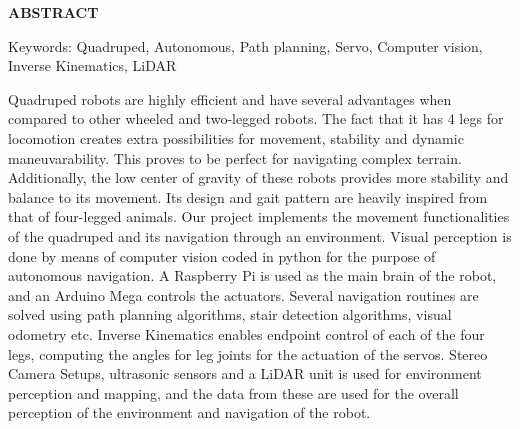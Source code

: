 \begin{center}
    \Large \textbf{ABSTRACT}\\
\end{center}
\vspace{0.5cm} 

Keywords: Quadruped, Autonomous, Path planning, Servo, Computer vision, Inverse Kinematics, LiDAR\\
\vspace{0.5cm}

Quadruped robots are highly efficient and have several advantages when compared to other wheeled and two-legged robots. The fact that it has 4 legs for locomotion creates extra possibilities for movement, stability and dynamic maneuvarability. This proves to be perfect for navigating complex terrain. Additionally, the low center of gravity of these robots provides more stability and balance to its movement. Its design and gait pattern are heavily inspired from that of four-legged animals. Our project implements the movement functionalities of the quadruped and its navigation through an environment. Visual perception is done by means of computer vision coded in python for the purpose of autonomous navigation. A Raspberry Pi is used as the main brain of the robot, and an Arduino Mega controls the actuators. Several navigation routines are solved using path planning algorithms, stair detection algorithms, visual odometry etc. Inverse Kinematics enables endpoint control of each of the four legs, computing the angles for leg joints for the actuation of the servos. Stereo Camera Setups, ultrasonic sensors and a LiDAR unit is used for environment perception and mapping, and the data from these are used for the overall perception of the environment and navigation of the robot.